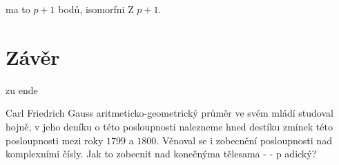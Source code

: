 \documentclass[12pt]{report}
\begin{document}
ma to $p+1$ bodů, isomorfni Z $p+1$. 





\chapter*{Závěr}
zu ende

Carl Friedrich Gauss aritmeticko-geometrický průměr ve svém mládí studoval hojně, v jeho deníku o této posloupnosti nalezneme hned destíku zmínek této posloupnosti mezi roky $1799$ a $1800$. Věnoval se i zobecnění posloupnosti nad komplexními čísly. Jak to zobecnit nad konečnýma tělesama - - p adický?





\end{document}
